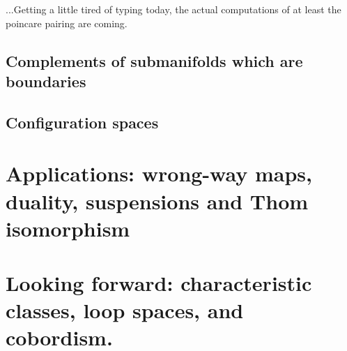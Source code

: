 \documentclass{amsart}          %
\begin{document}
...Getting a little tired of typing today, the actual computations of at least the poincare pairing are coming. 

\subsection{Complements of submanifolds which are boundaries}

\subsection{Configuration spaces}

\section{Applications: wrong-way maps, duality, suspensions and Thom isomorphism}

\section{Looking forward: characteristic classes, loop spaces, and cobordism.}

\nocite{*}


\printindex
\end{document}
